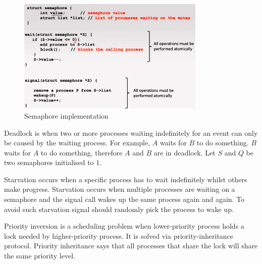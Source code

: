 \documentclass[a4paper]{article}
\theoremstyle{plain}
\theoremstyle{definition}
\newtheorem{defn}{Definition}[section]
\theoremstyle{remark}
\begin{document}
\begin{tcolorbox}[colback=black!3!white,colframe=black!60!white,title=\begin{defn}Semaphores \label{Semaphores}\end{defn}]
\begin{figure}[H]
	\centering
	\includegraphics[width=0.8\textwidth]{fourtynine.png}
	\caption{Semaphore implementation}
	\label{fig:fourtynine-png}
\end{figure}
\end{tcolorbox}
\begin{tcolorbox}[colback=black!3!white,colframe=black!60!white,title=\begin{defn}Deadlock \label{Deadlock}\end{defn}]
Deadlock is when two or more processes waiting indefinitely for an event can only be caused by the waiting process. For example, $A$ waits for $B$ to do something. $B$ waits for $A$ to do something, therefore $A$ and $B$ are in deadlock. Let $S$ and $Q$ be two semaphores initialised to $1$.
\end{tcolorbox}
\begin{tcolorbox}[colback=black!3!white,colframe=black!60!white,title=\begin{defn}Starvation \label{Starvation}\end{defn}]
Starvation occurs when a specific process has to wait indefinitely whilst others make progress. Starvation occurs when multiple processes are waiting on a semaphore and the signal call wakes up the same process again and again. To avoid such starvation signal should randomly pick the process to wake up.
\end{tcolorbox}
\begin{tcolorbox}[colback=black!3!white,colframe=black!60!white,title=\begin{defn}Priority Inversion \label{Priority Inversion}\end{defn}]
Priority inversion is a scheduling problem when lower-priority process holds a lock needed by higher-priority process. It is solved via priority-inheritance protocol. Priority inheritance says that all processes that share the lock will share the same priority level. 
\end{tcolorbox}
\end{document}
